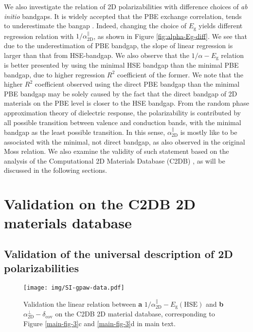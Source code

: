 \documentclass[manuscript=suppinfo,email=true,hyperref=true,keywords=false]{achemso}
\begin{document}
We also investigate the relation of 2D polarizabilities with
difference choices of \textit{ab initio} bandgaps. It is widely
accepted that the PBE exchange correlation, tends to underestimate the
bangap \cite{Heyd_2005,Kumar_2016_PRB,Kumar_2016_jpcc}.  Indeed,
changing the choice of $E_{\mathrm{g}}$ yields different regression
relation with $1/\alpha_{\mathrm{2D}}^{\parallel}$, as shown in Figure
\ref{fig:alpha-Eg-diff}. We see that due to the underestimation of PBE
bandgap, the slope of linear regression is larger than that from
HSE-bandgap. We also observe that the $1/\alpha-E_{\mathrm{g}}$
relation is better presented by using the minimal HSE bandgap than the
minimal PBE bandgap, due to higher regression $R^{2}$ coefficient of
the former. We note that the higher $R^{2}$ coefficient observed using
the direct PBE bandgap than the minimal PBE bandgap may be solely
caused by the fact that the direct bandgap of 2D materials on the PBE
level is closer to the HSE bandgap. From the random phase
approximation theory of dielectric response, the polarizability is
contributed by all possible transition between valence and conduction
bands, with the minimal bandgap as the least possible transition. In
this sense, $\alpha_{\mathrm{2D}}^{\parallel}$ is mostly like to be associated with
the minimal, not direct bandgap, as also observed in the original Moss
relation. We also examine the validity of such statement based on the
analysis of the Computational 2D Materials Database (C2DB)
\cite{Haastrup_2018}, as will be discussed in the following sections.


\section{Validation on the C2DB 2D materials database}
\subsection{Validation of the universal description of 2D polarizabilities}
\label{sec:gpaw-1}

\begin{figure}[htbp]
  \centering
  \texttt{[image: img/SI-gpaw-data.pdf]}
  \caption{Validation the linear relation between \textbf{a}
    $1/\alpha_{\mathrm{2D}}^{\parallel}-E_{\mathrm{g}}(\mathrm{HSE})$
    and \textbf{b}
    $\alpha_{\mathrm{2D}}^{\perp}-\delta_{\mathrm{cov}}$ on the C2DB
    2D material database, corresponding to Figure \ref{main-fig-3}c
    and \ref{main-fig-3}d in main text.}
  \label{fig:gpaw-alpha-relation}
\end{figure}
\end{document}
